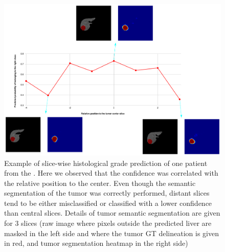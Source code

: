 \begin{figure}[th!]
	\centering
	\includegraphics[width=0.9\linewidth]{../HistologicalGradePrediction/images/Slice_hist_grad_prediction_v3}
	\caption{Example of slice-wise histological grade prediction of one patient from the . Here we observed that the confidence was correlated with the relative position to the center. Even though the semantic segmentation of the tumor was correctly performed, distant slices tend to be either misclassified or classified with a lower confidence than central slices. Details of tumor semantic segmentation are given for 3 slices (raw image where pixels outside the predicted liver are masked in the left side and where the tumor GT delineation is given in red, and tumor segmentation heatmap in the right side)}
	\label{fig:Slice_hist_grad_prediction_2}
\end{figure}


